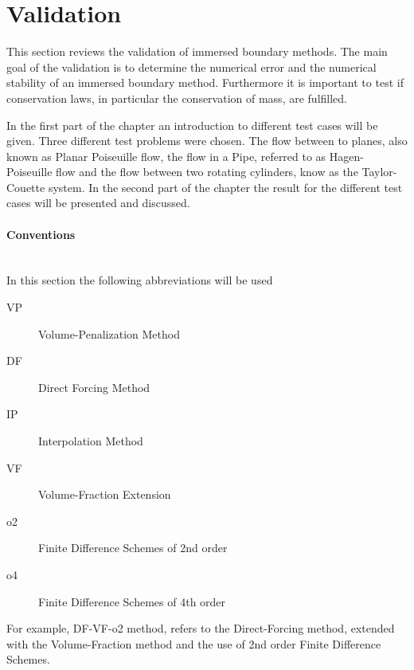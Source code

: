 \section{Validation}

This section reviews the validation of immersed boundary methods.
The main goal of the validation is to determine the numerical error and the
numerical stability of an immersed boundary method.
Furthermore it is important to test if conservation laws, in particular the conservation of mass,
are fulfilled.

In the first part of the chapter an introduction to different test cases
will be given. Three different test problems were chosen.
The flow between to planes, also known as Planar Poiseuille flow, the flow in a Pipe, referred to as Hagen-Poiseuille flow and the flow
between two rotating cylinders, know as the Taylor-Couette system.
In the second part of the chapter the result for the different test cases will be presented and discussed.

\paragraph{Conventions}\mbox{}\\

In this section the following abbreviations will be used

\begin{multicols}{2}
\begin{description}
    \item[VP]{Volume-Penalization Method}
    \item[DF]{Direct Forcing Method}
    \item[IP]{Interpolation Method}
    \item[VF]{Volume-Fraction Extension}
    \item[o2]{Finite Difference Schemes of 2nd order}
    \item[o4]{Finite Difference Schemes of 4th order}
\end{description}
\end{multicols}

For example, DF-VF-o2 method, refers to the Direct-Forcing method, extended with the Volume-Fraction
method and the use of 2nd order Finite Difference Schemes.

\clearpage

